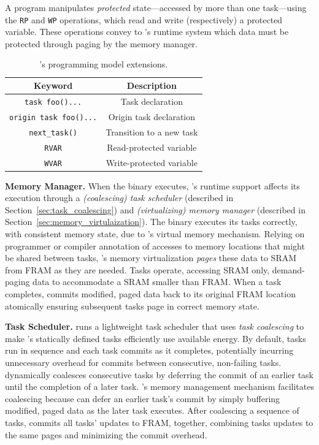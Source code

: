 A \sys program manipulates {\em protected} state---accessed by more than one task---using the {\tt RP} and {\tt WP} operations, which read and write (respectively) a protected variable. These operations convey to \sys's runtime system which data must be protected through paging by the memory manager.   

\begin{table}
	\centering
	\footnotesize
	\begin{tabular}{|c|c|}
		\hline
		Keyword & Description\\
		\hline\hline
		\texttt{task foo(){...}} & Task declaration\\
		\texttt{origin task foo(){...}} & Origin task declaration\\
		\texttt{next\_task()} & Transition to a new task\\
		\texttt{RVAR} & Read-protected variable\\
		\texttt{WVAR} & Write-protected variable\\
		\hline
	\end{tabular}
	\caption{\sys's programming model extensions.}
	\label{tab:viper_syntax}
\end{table}

\textbf{\sys Memory Manager.} When the binary executes, \sys's runtime support affects its execution through a {\em (coalescing) task scheduler} (described in Section~\ref{sec:task_coalescing}) and {\em (virtualizing) memory manager} (described in Section~\ref{sec:memory_virtulaization}). The \sys binary executes its tasks correctly, with consistent memory state, due to \sys's virtual memory mechanism. Relying on programmer or compiler annotation of accesses to memory locations that might be shared between tasks, \sys's memory virtualization {\em pages} these data to SRAM from FRAM as they are needed. Tasks operate, accessing SRAM only, demand-paging data to accommodate a SRAM smaller than FRAM. When a task completes, \sys commits modified, paged data back to its original FRAM location atomically ensuring subsequent tasks page in correct memory state.

\textbf{\sys Task Scheduler.} \sys runs a lightweight task scheduler that uses {\em task coalescing} to make \sys's statically defined tasks efficiently use available energy. By default, tasks run in sequence and each task commits as it completes, potentially incurring unnecessary overhead for commits between consecutive, non-failing tasks. \sys dynamically coalesces consecutive tasks by deferring the commit of an earlier task until the completion of a later task. \sys's memory management mechanism facilitates coalescing because \sys can defer an earlier task's commit by simply buffering modified, paged data as the later task executes. After coalescing a sequence of tasks, \sys commits all tasks' updates to FRAM, together, combining tasks updates to the same pages and minimizing the commit overhead.
